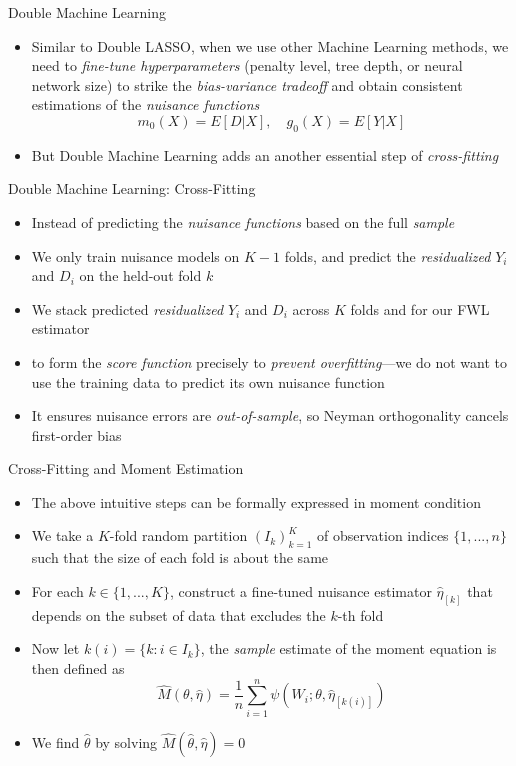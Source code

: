 \documentclass[aspectratio=1610,12pt,xcolor=dvipsnames]{beamer}
\begin{document}
\begin{frame}{Double Machine Learning}

\begin{itemize}
    \item Similar to Double LASSO, when we use other Machine Learning methods,
    we need to \textit{fine-tune hyperparameters} (penalty level, tree depth, or neural network size)
    to strike the \textit{bias-variance tradeoff} and obtain consistent estimations of the
    \textit{nuisance functions}
    \[
    m_0(X) = E[D|X], \quad g_0(X) = E[Y|X]
    \]
    \item But Double Machine Learning adds an another essential step of \textit{cross-fitting}
\end{itemize}
\end{frame}

\begin{frame}{Double Machine Learning: Cross-Fitting}

\begin{itemize}
    \item Instead of predicting the \textit{nuisance functions} based on the full \textit{sample}
    \item We only train nuisance models on $K-1$ folds, and predict the \textit{residualized} $Y_i$ and $D_i$ on the held-out fold $k$
    \item We stack predicted \textit{residualized} $Y_i$ and $D_i$ across $K$ folds and for our FWL estimator
    \item to form the \textit{score function} precisely to \textit{prevent overfitting}—we do not want to use the training data to predict its own nuisance function
    \item It ensures nuisance errors are \textit{out-of-sample}, so Neyman orthogonality cancels first-order bias
\end{itemize}
\end{frame}

\begin{frame}{Cross-Fitting and Moment Estimation}

\begin{itemize}
    \item The above intuitive steps can be formally expressed in moment condition
    \item We take a $K$-fold random partition $(I_k)_{k=1}^{K}$ of observation indices $\{1,...,n\}$ such that the size of each fold is about the same
    \item For each $k \in \{1,...,K\}$, construct a fine-tuned nuisance estimator $\hat \eta_{[k]}$ that depends on the subset of data that excludes the $k$-th fold
    \item Now let $k(i) = \{k:i \in I_k\}$, the \textit{sample} estimate of the moment equation is then defined as
    \[
    \hat M(\theta,\hat\eta) = \frac{1}{n}\sum_{i=1}^n 
    \psi\left(W_i;\theta,\hat \eta_{[k(i)]}\right)
    \]
    \item We find $\hat \theta$ by solving $\hat M(\hat\theta,\hat\eta)=0$
\end{itemize}
\end{frame}
\end{document}
